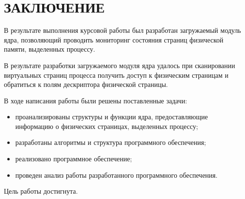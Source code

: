 \chapter*{ЗАКЛЮЧЕНИЕ}

В результате выполнения курсовой работы был разработан загружаемый модуль ядра, позволяющий проводить мониторинг состояния страниц физической памяти, выделенных процессу.

В результате разработки загружаемого модуля ядра удалось при сканировании виртуальных страниц процесса получить доступ к физическим страницам и обратиться к полям дескриптора физической страницы.

В ходе написания работы были решены поставленные задачи:
\begin{itemize}
	\item проанализированы структуры и функции ядра, предоставляющие информацию о физических страницах, выделенных процессу;
	\item разработаны алгоритмы и структура программного обеспечения;
	\item реализовано программное обеспечение;
	\item проведен анализ работы разработанного программного обеспечения.
\end{itemize}

Цель работы достигнута.